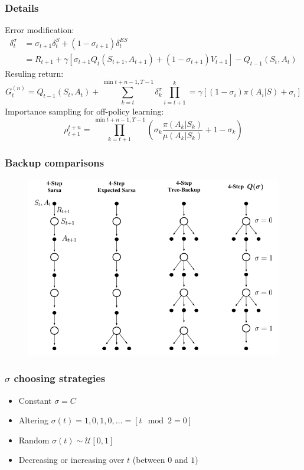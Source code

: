 \documentclass{beamer}
\begin{document}
\begin{frame}
  \frametitle{Details}
  Error modification:
  \begin{align*}
    \delta_t^{\sigma}
      &= \sigma_{t+1} \delta_{t}^S + (1 - \sigma_{t + 1}) \delta_t^{ES} \\
      &= R_{t + 1} + \gamma [\sigma_{t + 1} Q_t(S_{t + 1}, A_{t + 1}) +
                          (1 - \sigma_{t+ 1}) V_{t + 1}] - Q_{t - 1}(S_t, A_t)
  \end{align*}
  Resuling return:
  $$G_{t}^{(n)} = Q_{t - 1}(S_t, A_t) + \sum_{k = t}^{\min{t + n - 1, T- 1}}
    \delta_k^{\sigma} \prod_{i = t + 1}^{k} = \gamma
    [(1 - \sigma_i) \pi (A_i | S) + \sigma_i]$$
  Importance sampling for off-policy learning:
  $$\rho_{t + 1}^{t + n} = \prod_{k = t + 1}^{\min{t + n - 1, T - 1}}
    (\sigma_k \frac{\pi(A_k | S_k)}{\mu(A_k | S_k)} + 1 - \sigma_k)$$
\end{frame}

\begin{frame}
  \frametitle{Backup comparisons}
  \begin{figure}
    \centering
    \includegraphics[width=0.7 \textwidth]{all-multi-step-backups}
  \end{figure}
\end{frame}

\begin{frame}
  \frametitle{$\sigma$ choosing strategies}
  \begin{itemize}
    \item Constant $\sigma = C$
    \item Altering $\sigma(t) = 1, 0, 1, 0, \ldots = [t \mod 2 = 0]$
    \item Random $\sigma(t) \sim \mathcal{U}[0, 1]$
    \item Decreasing or increasing over $t$ (between $0$ and $1$)
  \end{itemize}
\end{frame}
\end{document}
